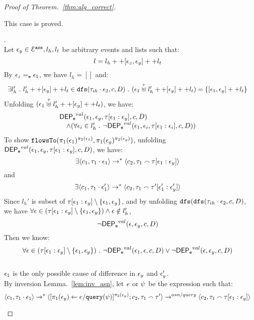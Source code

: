 \documentclass[a4paper,11pt]{article}
\begin{document}
\begin{proof}[Proof of Theorem.~\ref{thm:alg_correct}]
\begin{case}
\begin{subcase}
\begin{subsubcase}
\[\]
This case is proved.
%
\end{subsubcase}
%
\begin{subsubcase}.
\\
Let $\mathtt{\epsilon}_y \in \mathcal{E}^{\mathtt{{asn}}}, l_h, l_t$ be arbitrary events and lists such that:
\[
  l = l_h ++ [\mathtt{\epsilon}_z, \mathtt{\epsilon}_y] ++ l_t 
\]
%
By $\mathtt{\epsilon}_z =_{\mathtt{e}} \mathtt{\epsilon}_1$, we have $l_h = []$ and:
\[
\begin{array}{l}
  \exists l_{h}' ~.~ l_{h}' ++ [\mathtt{\epsilon}_y] ++ l_t \in \mathtt{dfs}(\mathtt{\tau}_{ih}\cdot \mathtt{\epsilon}_2, c, D) ~.~
   (\mathtt{\epsilon}_1 \stackrel{\mathtt{\tau}}{\uplus} l_{h}' ++ [\mathtt{\epsilon}_y] ++ l_t) = \{[\mathtt{\epsilon}_1, \mathtt{\epsilon}_y] ++ l_t\}
\end{array}
\]
%
Unfolding $(\mathtt{\epsilon}_1 \stackrel{\mathtt{\tau}}{\uplus} l_{h}' ++ [\mathtt{\epsilon}_y] ++ l_t)$, we have:
\[
\begin{array}{l}
  \mathsf{DEP_{\mathtt{e}}}^{val}(\mathtt{\epsilon}_1, \mathtt{\epsilon}_y, \mathtt{\tau}[\mathtt{\epsilon}_1:\mathtt{\epsilon}_y], c, D)
  \\ \quad \land 
  (\forall \mathtt{\epsilon}_i \in l_{h}' ~.~ \neg \mathsf{DEP_{\mathtt{e}}}^{val} (\mathtt{\epsilon}_1, \mathtt{\epsilon}_i, \mathtt{\tau}[\mathtt{\epsilon}_1: \mathtt{\epsilon}_i], c, D))
\end{array}
\]
%
To show $\mathtt{flowsTo}(\pi_1(\mathtt{\epsilon}_1)^{\pi_2(\mathtt{\epsilon}_1)}, \pi_1(\mathtt{\epsilon}_y)^{\pi_2(\mathtt{\epsilon}_y)})$, unfolding $\mathsf{DEP_{\mathtt{e}}}^{val}(\mathtt{\epsilon}_1, \mathtt{\epsilon}_y, \mathtt{\tau}[\mathtt{\epsilon}_1:\mathtt{\epsilon}_y], c, D)$, we have:
\[
\exists \langle c_1, \mathtt{\tau}_1 \cdot \mathtt{\epsilon}_1 \rangle \rightarrow^{*} \langle c_2, \mathtt{\tau}_1 \smallfrown \mathtt{\tau}[\mathtt{\epsilon}_1:\mathtt{\epsilon}_y] \rangle 
\]
and 
\[
\exists \langle c_1, \mathtt{\tau}_1 \cdot \mathtt{\epsilon}_1' \rangle \rightarrow^{*} \langle c_2, \mathtt{\tau}_1 \smallfrown \mathtt{\tau}'[\mathtt{\epsilon}_1':\mathtt{\epsilon}_y'] \rangle 
\]
Since $l_{h}'$ is subset of $\mathtt{\tau}[\mathtt{\epsilon}_1:\mathtt{\epsilon}_y] \setminus \{\mathtt{\epsilon}_1, \mathtt{\epsilon}_y\}$, and 
%
 by unfolding $\mathtt{dfs}(\mathtt{dfs}(\mathtt{\tau}_{ih}\cdot \mathtt{\epsilon}_2, c, D) $, we have 
 $\forall \mathtt{\epsilon} \in (\mathtt{\tau}[\mathtt{\epsilon}_1:\mathtt{\epsilon}_y]\setminus \{\mathtt{\epsilon}_1, \mathtt{\epsilon}_y\}) 
 \land \mathtt{\epsilon} \notin l_h'$,
\[
  \neg \mathsf{DEP_{\mathtt{e}}}^{val} (\mathtt{\epsilon}, \mathtt{\epsilon}_y, c, D)
\]
%
Then we know:
\[
  \forall \mathtt{\epsilon} \in (\mathtt{\tau}[\mathtt{\epsilon}_1:\mathtt{\epsilon}_y]\setminus \{\mathtt{\epsilon}_1, \mathtt{\epsilon}_y\}) ~.~
  \neg \mathsf{DEP_{\mathtt{e}}}^{val} (\mathtt{\epsilon}_1, \mathtt{\epsilon}, c, D) \lor \neg \mathsf{DEP_{\mathtt{e}}}^{val} (\mathtt{\epsilon}, \mathtt{\epsilon}_y, c, D)
\]
\\
%
$\mathtt{\epsilon}_1$ is the only possible cause of difference in $\mathtt{\epsilon}_y$ and $\mathtt{\epsilon}_y'$.
%
\\
%
By inversion Lemma.~\ref{lem:inv_asn}, let $e$ or $\psi$ be the expression such that:
\[
\langle c_1, \mathtt{\tau}_1 \cdot \mathtt{\epsilon}_1 \rangle \rightarrow^{*} \langle [\mathrel{ \pi_1(\mathtt{\epsilon}_y) \leftarrow e / {\tt query}(\psi) }]{}^{\pi_2(\mathtt{\epsilon}_y)};c_2, \mathtt{\tau}_1 \smallfrown \mathtt{\tau}' \rangle \rightarrow^{asn / query} \langle c_2, \mathtt{\tau}_1 \smallfrown \mathtt{\tau}[\mathtt{\epsilon}_1:\mathtt{\epsilon}_y] \rangle 
\]
\end{subsubcase}
\end{subcase}
\end{case}
\end{proof}
\end{document}
